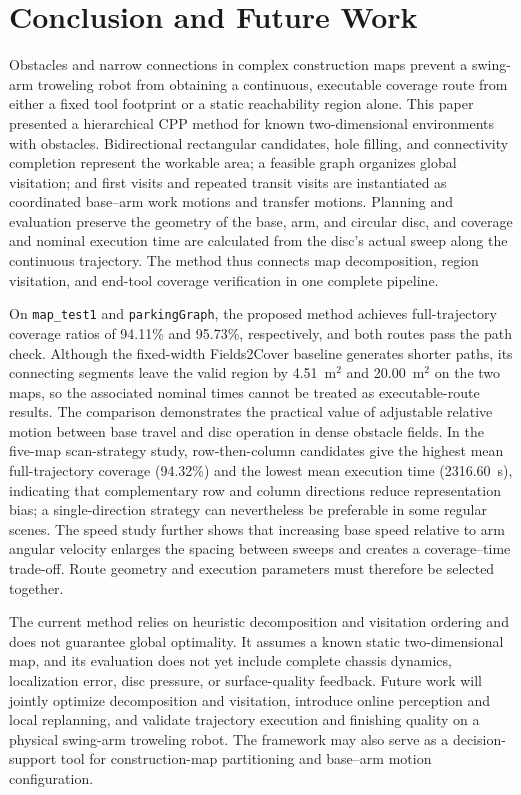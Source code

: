 \section{Conclusion and Future Work}
\label{sec:conclusion}

Obstacles and narrow connections in complex construction maps prevent a swing-arm troweling robot from obtaining a continuous, executable coverage route from either a fixed tool footprint or a static reachability region alone. This paper presented a hierarchical CPP method for known two-dimensional environments with obstacles. Bidirectional rectangular candidates, hole filling, and connectivity completion represent the workable area; a feasible graph organizes global visitation; and first visits and repeated transit visits are instantiated as coordinated base--arm work motions and transfer motions. Planning and evaluation preserve the geometry of the base, arm, and circular disc, and coverage and nominal execution time are calculated from the disc's actual sweep along the continuous trajectory. The method thus connects map decomposition, region visitation, and end-tool coverage verification in one complete pipeline.

On \texttt{map\_test1} and \texttt{parkingGraph}, the proposed method achieves full-trajectory coverage ratios of 94.11\% and 95.73\%, respectively, and both routes pass the path check. Although the fixed-width Fields2Cover baseline generates shorter paths, its connecting segments leave the valid region by 4.51~m$^2$ and 20.00~m$^2$ on the two maps, so the associated nominal times cannot be treated as executable-route results. The comparison demonstrates the practical value of adjustable relative motion between base travel and disc operation in dense obstacle fields. In the five-map scan-strategy study, row-then-column candidates give the highest mean full-trajectory coverage (94.32\%) and the lowest mean execution time (2316.60~s), indicating that complementary row and column directions reduce representation bias; a single-direction strategy can nevertheless be preferable in some regular scenes. The speed study further shows that increasing base speed relative to arm angular velocity enlarges the spacing between sweeps and creates a coverage--time trade-off. Route geometry and execution parameters must therefore be selected together.

The current method relies on heuristic decomposition and visitation ordering and does not guarantee global optimality. It assumes a known static two-dimensional map, and its evaluation does not yet include complete chassis dynamics, localization error, disc pressure, or surface-quality feedback. Future work will jointly optimize decomposition and visitation, introduce online perception and local replanning, and validate trajectory execution and finishing quality on a physical swing-arm troweling robot. The framework may also serve as a decision-support tool for construction-map partitioning and base--arm motion configuration.
